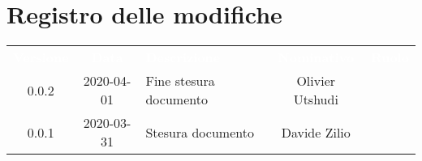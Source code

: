 \section*{Registro delle modifiche}
{
	\centering
	\begin{longtable}{ c c  C{4cm}  c  c }
		\textcolor{white}{\textbf{Versione}} & \textcolor{white}{\textbf{Data}} & \textcolor{white}{\textbf{Descrizione}} & \textcolor{white}{\textbf{Nominativo}} & \textcolor{white}{\textbf{Ruolo}}\\		
		0.0.2 & 2020-04-01 & Fine stesura documento & Olivier Utshudi &\redo{}\\
		0.0.1 & 2020-03-31 & Stesura documento & Davide Zilio &\reda{}\\		
		
	\end{longtable}

}